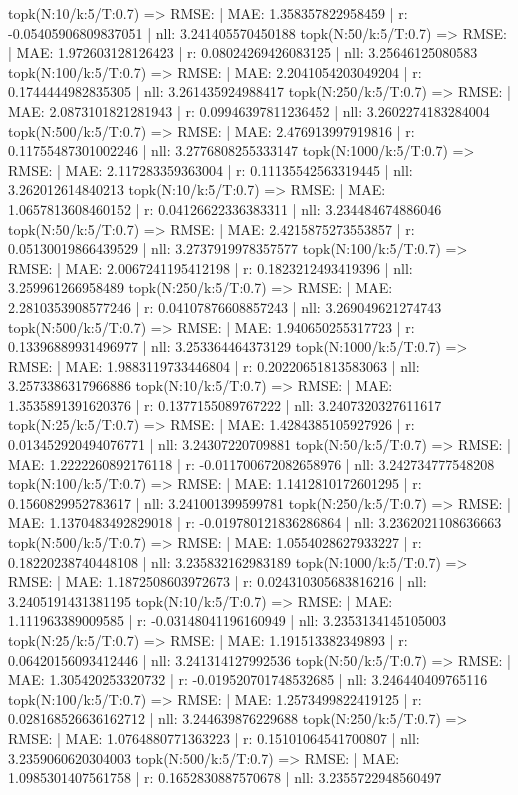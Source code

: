 topk(N:10/k:5/T:0.7) => RMSE: | MAE: 1.358357822958459 | r: -0.05405906809837051 | nll: 3.241405570450188
topk(N:50/k:5/T:0.7) => RMSE: | MAE: 1.972603128126423 | r: 0.08024269426083125 | nll: 3.25646125080583
topk(N:100/k:5/T:0.7) => RMSE: | MAE: 2.2041054203049204 | r: 0.1744444982835305 | nll: 3.261435924988417
topk(N:250/k:5/T:0.7) => RMSE: | MAE: 2.0873101821281943 | r: 0.09946397811236452 | nll: 3.2602274183284004
topk(N:500/k:5/T:0.7) => RMSE: | MAE: 2.476913997919816 | r: 0.11755487301002246 | nll: 3.2776808255333147
topk(N:1000/k:5/T:0.7) => RMSE: | MAE: 2.117283359363004 | r: 0.11135542563319445 | nll: 3.262012614840213
topk(N:10/k:5/T:0.7) => RMSE: | MAE: 1.0657813608460152 | r: 0.04126622336383311 | nll: 3.234484674886046
topk(N:50/k:5/T:0.7) => RMSE: | MAE: 2.4215875273553857 | r: 0.05130019866439529 | nll: 3.2737919978357577
topk(N:100/k:5/T:0.7) => RMSE: | MAE: 2.0067241195412198 | r: 0.1823212493419396 | nll: 3.259961266958489
topk(N:250/k:5/T:0.7) => RMSE: | MAE: 2.2810353908577246 | r: 0.04107876608857243 | nll: 3.269049621274743
topk(N:500/k:5/T:0.7) => RMSE: | MAE: 1.940650255317723 | r: 0.13396889931496977 | nll: 3.253364464373129
topk(N:1000/k:5/T:0.7) => RMSE: | MAE: 1.9883119733446804 | r: 0.20220651813583063 | nll: 3.2573386317966886
topk(N:10/k:5/T:0.7) => RMSE: | MAE: 1.3535891391620376 | r: 0.1377155089767222 | nll: 3.2407320327611617
topk(N:25/k:5/T:0.7) => RMSE: | MAE: 1.4284385105927926 | r: 0.013452920494076771 | nll: 3.24307220709881
topk(N:50/k:5/T:0.7) => RMSE: | MAE: 1.2222260892176118 | r: -0.011700672082658976 | nll: 3.242734777548208
topk(N:100/k:5/T:0.7) => RMSE: | MAE: 1.1412810172601295 | r: 0.1560829952783617 | nll: 3.241001399599781
topk(N:250/k:5/T:0.7) => RMSE: | MAE: 1.1370483492829018 | r: -0.019780121836286864 | nll: 3.2362021108636663
topk(N:500/k:5/T:0.7) => RMSE: | MAE: 1.0554028627933227 | r: 0.18220238740448108 | nll: 3.235832162983189
topk(N:1000/k:5/T:0.7) => RMSE: | MAE: 1.1872508603972673 | r: 0.024310305683816216 | nll: 3.2405191431381195
topk(N:10/k:5/T:0.7) => RMSE: | MAE: 1.111963389009585 | r: -0.03148041196160949 | nll: 3.2353134145105003
topk(N:25/k:5/T:0.7) => RMSE: | MAE: 1.191513382349893 | r: 0.06420156093412446 | nll: 3.241314127992536
topk(N:50/k:5/T:0.7) => RMSE: | MAE: 1.305420253320732 | r: -0.019520701748532685 | nll: 3.246440409765116
topk(N:100/k:5/T:0.7) => RMSE: | MAE: 1.2573499822419125 | r: 0.028168526636162712 | nll: 3.244639876229688
topk(N:250/k:5/T:0.7) => RMSE: | MAE: 1.0764880771363223 | r: 0.15101064541700807 | nll: 3.2359060620304003
topk(N:500/k:5/T:0.7) => RMSE: | MAE: 1.0985301407561758 | r: 0.1652830887570678 | nll: 3.2355722948560497
